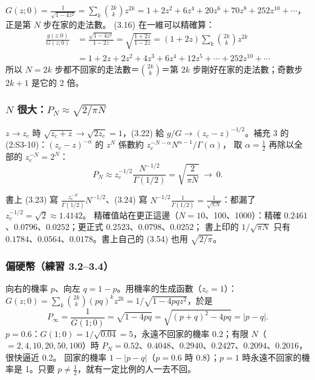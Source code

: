 $G(z;0)=\frac{1}{\sqrt{1-4z^2}}=\sum_k\binom{2k}{k}z^{2k}=1+2z^2+6z^4+20z^6+70z^8+252z^{10}+\cdots$，正是第 $N$ 步在家的走法數。
(3.16) 在一維可以精確算：
\begin{align*}
\frac{g(z;0)}{G(z;0)}&=\frac{\sqrt{1-4z^2}}{1-2z}=\sqrt{\frac{1+2z}{1-2z}}=(1+2z)\sum_k\binom{2k}{k}z^{2k}\\
&=1+2z+2z^2+4z^3+6z^4+12z^5+\cdots+252z^{10}+\cdots
\end{align*}
所以 $N=2k$ 步都不回家的走法數＝$\binom{2k}{k}$＝第 $2k$ 步剛好在家的走法數；奇數步 $2k+1$ 是它的 2 倍。
\begin{table}[H]
\centering
\ThreeTabNever
\caption{一維：$N$ 步都不回家的走法數（$\sqrt{(1+2z)/(1-2z)}$ 的係數）與機率 $P_N$。偶數 $N$ 那一欄和「第 $N$ 步在家」一樣多}\label{three-tab-never}
\end{table}

\subsubsection{\texorpdfstring{$N$ 很大：$P_N\approx\sqrt{2/\pi N}$}{N 很大：P ≈ √(2/πN)}}
$z\to z_c$ 時 $\sqrt{z_c+z}\to\sqrt{2z_c}=1$，(3.22) 給 $g/G\to(z_c-z)^{-1/2}$。補充 3 的 (2:S3-10)：$(z_c-z)^{-\alpha}$ 的 $z^N$ 係數約 $z_c^{-N-\alpha}N^{\alpha-1}/\Gamma(\alpha)$，
取 $\alpha=\frac12$ 再除以全部的 $z_c^{-N}=2^N$：
\[P_N\approx z_c^{-1/2}\frac{N^{-1/2}}{\Gamma(1/2)}=\sqrt{\frac{2}{\pi N}}\ \to\ 0.\tag{3.23, 3.24}\]
\begin{errbox}[p.~57，(3.23)(3.24)]
書上 (3.23) 寫 $\frac{z_c^{-N}}{\Gamma(1/2)}N^{-1/2}$、(3.24) 寫 $N^{-1/2}\frac{1}{\Gamma(1/2)}=\frac{1}{\sqrt{\pi N}}$：都漏了 $z_c^{-1/2}=\sqrt2\approx1.4142$。
精確值站在更正這邊（$N=10$、100、1000）：精確 $0.2461$、$0.0796$、$0.0252$；更正式 $0.2523$、$0.0798$、$0.0252$；
書上印的 $1/\sqrt{\pi N}$ 只有 $0.1784$、$0.0564$、$0.0178$。書上自己的 (3.54) 也用 $\sqrt{2/\pi}$。
\end{errbox}

\subsubsection{偏硬幣（練習 3.2--3.4）}
向右的機率 $p$、向左 $q=1-p$。用機率的生成函數（$z_c=1$）：$G(z;0)=\sum_k\binom{2k}{k}(pq)^kz^{2k}=1/\sqrt{1-4pqz^2}$，於是
\[P_\infty=\frac{1}{G(1;0)}=\sqrt{1-4pq}=\sqrt{(p+q)^2-4pq}=|p-q|.\]
$p=0.6$：$G(1;0)=1/\sqrt{0.04}=5$，永遠不回家的機率 $0.2$；有限 $N$（$=2,4,10,20,50,100$）時 $P_N=0.52$、$0.4048$、$0.2940$、$0.2427$、$0.2094$、$0.2016$，很快逼近 0.2。
回家的機率 $1-|p-q|$（$p=0.6$ 時 0.8）；$p=1$ 時永遠不回家的機率是 1。只要 $p\ne\frac12$，就有一定比例的人一去不回。

